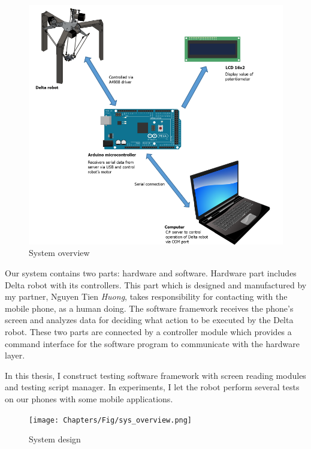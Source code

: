 	\begin{figure}
		\centering
		\includegraphics[scale=0.7]{Chapters/Fig/sys_overview_hw.png}
		\caption{System overview}
		\label{fig:sys_overview_hw}
	\end{figure}

Our system contains two parts: hardware and software.
Hardware part includes Delta robot with its controllers. This part which is designed and manufactured by my partner, Nguyen Tien \textit{Huong}, takes responsibility for contacting with the mobile phone, as a human doing.
The software framework receives the phone's screen and analyzes data for deciding what action to be executed by the Delta robot.
These two parts are connected by a controller module which provides a command interface for the software program to communicate with the hardware layer.

In this thesis, I construct testing software framework with screen reading modules and testing script manager. In experiments, I let the robot perform several tests on our phones with some mobile applications.

	\begin{figure}[H]
		\centering
		\texttt{[image: Chapters/Fig/sys\_overview.png]}
		\caption{System design}
		\label{fig:sys_overview}
	\end{figure}

